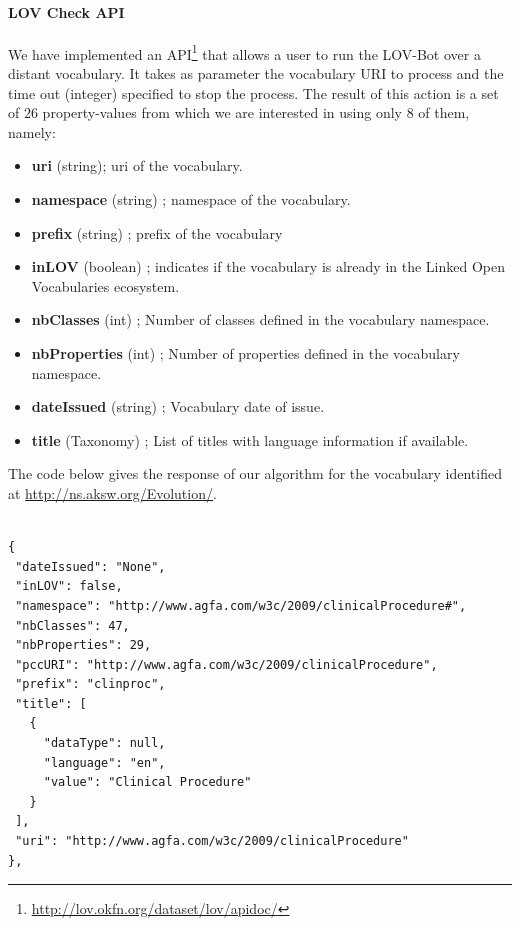 \paragraph{LOV Check API}
We have implemented an API\footnote{\url{http://lov.okfn.org/dataset/lov/apidoc/}} that allows a user to run the LOV-Bot over a distant vocabulary. It takes as parameter the vocabulary URI to process and the time out (integer) specified to stop the process. The result of this action is a set of $26$ property-values from which we are interested in using only $8$ of them, namely:
\begin{itemize}
 \item \textbf{uri} (string); uri of the vocabulary.
 \item \textbf{namespace} (string) ; namespace of the vocabulary.
 \item {\textbf{prefix} (string) ;  prefix of the vocabulary}
 \item{\textbf{inLOV} (boolean) ; indicates if the vocabulary is already in the Linked Open Vocabularies ecosystem}.
 \item {\textbf{nbClasses} (int) ; Number of classes defined in the vocabulary namespace}.
 \item{\textbf{nbProperties} (int) ; Number of properties defined in the vocabulary namespace}.
 \item{\textbf{dateIssued }(string) ; Vocabulary date of issue}.
 \item{\textbf{title} (Taxonomy) ; List of titles with language information if available}.
\end{itemize}

The code below gives the response of our algorithm for the vocabulary identified at \url{http://ns.aksw.org/Evolution/}.

\begin{lstlisting}

{
 "dateIssued": "None",
 "inLOV": false,
 "namespace": "http://www.agfa.com/w3c/2009/clinicalProcedure#",
 "nbClasses": 47,
 "nbProperties": 29,
 "pccURI": "http://www.agfa.com/w3c/2009/clinicalProcedure",
 "prefix": "clinproc",
 "title": [
   {
     "dataType": null,
     "language": "en",
     "value": "Clinical Procedure"
   }
 ],
 "uri": "http://www.agfa.com/w3c/2009/clinicalProcedure"
},
\end{lstlisting}

